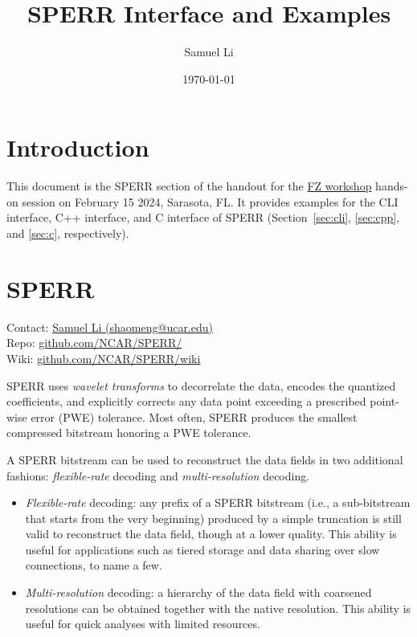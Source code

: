 \documentclass{article}
\title{SPERR Interface and Examples}
\author{Samuel Li}
\date{\today}
\begin{document}
\vspace{-1cm}
\maketitle

\vspace{-1cm}

\section{Introduction}
This document is the SPERR section of the handout for the 
\href{https://szcompressor.org/next.szcompressor.github.io/meetings/feb24fl/}{FZ workshop} 
hands-on session on February 15 2024, Sarasota, FL.
It provides examples for the CLI interface, C++ interface, and C interface of SPERR
(Section~\ref{sec:cli}, \ref{sec:cpp}, and \ref{sec:c}, respectively).

\section{SPERR}
Contact: \href{shaomeng@ucar.edu}{Samuel Li (shaomeng@ucar.edu)} \\
Repo: \href{https://github.com/NCAR/SPERR/}{github.com/NCAR/SPERR/} \\
Wiki: \href{https://github.com/NCAR/SPERR/wiki}{github.com/NCAR/SPERR/wiki}

\vspace{2mm}
SPERR uses \textit{wavelet transforms} to decorrelate the data, encodes the quantized 
coefficients, and explicitly corrects any data point exceeding a prescribed point-wise error
(PWE) tolerance.
Most often, SPERR produces the smallest compressed bitstream 
honoring a PWE tolerance.

A SPERR bitstream can be used to reconstruct the data fields 
in two additional fashions: \textit{flexible-rate} decoding and
\textit{multi-resolution} decoding.

\vspace{-2mm}
\begin{itemize}
\item \textit{Flexible-rate} decoding: any prefix of a SPERR bitstream 
(i.e., a sub-bitstream that starts from the very beginning)
produced by a simple truncation is still valid to reconstruct the data 
field, though at a lower quality.
This ability is useful for applications such as tiered storage and data sharing 
over slow connections, to name a few.
\vspace{-2mm}
\item \textit{Multi-resolution} decoding: a hierarchy of the data field
with coarsened resolutions can be obtained together with the 
native resolution.
This ability is useful for quick analyses with limited resources.
\end{itemize}
\end{document}
